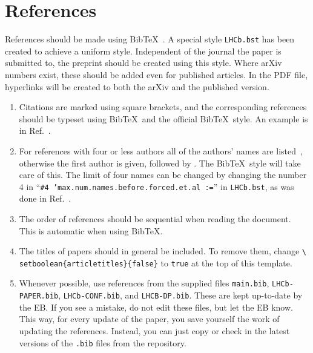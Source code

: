 \section{References}
\label{sec:References}

References should be made using Bib\TeX~\cite{BibTeX}. A special style
\texttt{LHCb.bst} has been created to achieve a uniform
style. Independent of the journal the paper is submitted to, the
preprint should be created using this style. Where arXiv numbers
exist, these should be added even for published articles. In the PDF
file, hyperlinks will be created to both the arXiv and the published
version.

\begin{enumerate}

\item Citations are marked using square brackets, and the
  corresponding references should be typeset using Bib\TeX\ and the
  official \lhcb Bib\TeX\ style. An example is in
  Ref.~\cite{Sjostrand:2006za}.

\item For references with four or less authors all of the authors'
  names are listed~\cite{Weinberg:1967}, otherwise the first author
  is given, followed by \etal. The \lhcb Bib\TeX\ style will
  take care of this. The limit of four names can be changed by changing the number 4 in 
  ``{\tt \#4 'max.num.names.before.forced.et.al :=}''
  in {\tt LHCb.bst}, as was done in Ref.~\cite{LHCb-PAPER-2017-038}.

\item The order of references should be sequential when reading the
  document. This is automatic when using Bib\TeX.

\item The titles of papers should in general be included. To remove
  them, change \texttt{\textbackslash
    setboolean\{articletitles\}\{false\}} to \texttt{true} at the top
  of this template.

\item Whenever possible, use references from the supplied files
\verb!main.bib!, \verb!LHCb-PAPER.bib!, \verb!LHCb-CONF.bib!, and \verb!LHCB-DP.bib!.
These are kept up-to-date by the EB. If you see a mistake, do not edit these files,
but let the EB know. This way, for every update of the paper, you save
yourself the work of updating the references. Instead, you can just copy or
check in the latest versions of the \verb!.bib! files from the repository.   


\end{enumerate}
